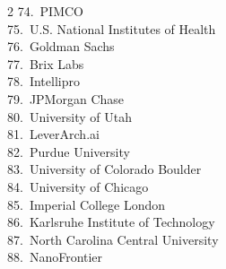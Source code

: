 {\begin{multicols}{2}
74.~PIMCO \\
75.~U.S. National Institutes of Health \\
76.~Goldman Sachs \\
77.~Brix Labs \\
78.~Intellipro \\
79.~JPMorgan Chase \\
80.~University of Utah \\
81.~LeverArch.ai \\
82.~Purdue University \\
83.~University of Colorado Boulder \\
84.~University of Chicago \\
85.~Imperial College London \\
86.~Karlsruhe Institute of Technology \\
87.~North Carolina Central University \\
88.~NanoFrontier
\end{multicols}}
